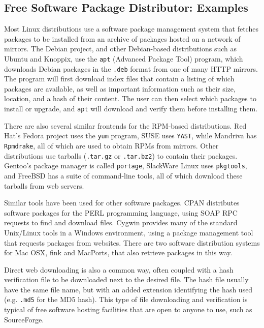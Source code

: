 \documentclass[conference]{IEEEtran}
\begin{document}
\subsection{Free Software Package Distributor: Examples}
\label{examples}


Most Linux distributions use a software package management system
that fetches packages to be installed from an archive of packages
hosted on a network of mirrors. The Debian project, and other
Debian-based distributions such as Ubuntu and Knoppix, use the
\texttt{apt} (Advanced Package Tool) program, which downloads Debian
packages in the \texttt{.deb} format from one of many HTTP mirrors.
The program will first download index files that contain a listing
of which packages are available, as well as important information
such as their size, location, and a hash of their content. The user
can then select which packages to install or upgrade, and
\texttt{apt} will download and verify them before installing them.

There are also several similar frontends for the RPM-based
distributions. Red Hat's Fedora project uses the \texttt{yum}
program, SUSE uses \texttt{YAST}, while Mandriva has
\texttt{Rpmdrake}, all of which are used to obtain RPMs from
mirrors. Other distributions use tarballs (\texttt{.tar.gz} or
\texttt{.tar.bz2}) to contain their packages. Gentoo's package
manager is called \texttt{portage}, SlackWare Linux uses
\texttt{pkgtools}, and FreeBSD has a suite of command-line tools,
all of which download these tarballs from web servers.

Similar tools have been used for other software packages. CPAN
distributes software packages for the PERL
programming language, using SOAP RPC requests to find and download
files. Cygwin provides many of the
standard Unix/Linux tools in a Windows environment, using a
package management tool that requests packages from websites. There
are two software distribution systems for Mac OSX, fink and
MacPorts, that also retrieve packages in this way.

Direct web downloading is also a common way, often coupled with a hash
verification file to be downloaded next to the desired
file. The hash file usually have the same file name, but with an
added extension identifying the hash used (e.g. \texttt{.md5} for
the MD5 hash). This type of file downloading and verification is
typical of free software hosting facilities that are open to anyone
to use, such as SourceForge.
\end{document}
